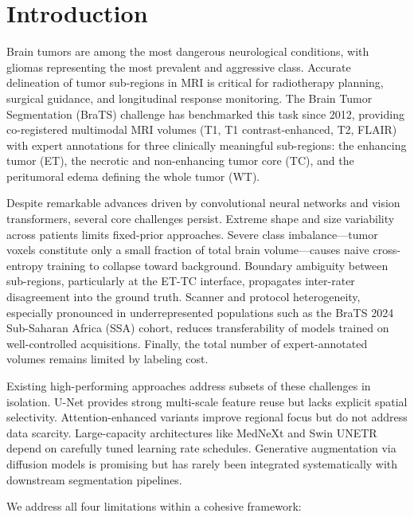 \documentclass[conference]{IEEEtran}
\begin{document}
\section{Introduction}

Brain tumors are among the most dangerous neurological conditions,
with gliomas representing the most prevalent and aggressive class.
Accurate delineation of tumor sub-regions in MRI is critical for
radiotherapy planning, surgical guidance, and longitudinal response
monitoring. The Brain Tumor Segmentation (BraTS) challenge
\cite{b1} has benchmarked this task since 2012, providing
co-registered multimodal MRI volumes (T1, T1 contrast-enhanced,
T2, FLAIR) with expert annotations for three clinically meaningful
sub-regions: the enhancing tumor (ET), the necrotic and
non-enhancing tumor core (TC), and the peritumoral edema defining
the whole tumor (WT).

Despite remarkable advances driven by convolutional neural networks
and vision transformers, several core challenges persist. Extreme
shape and size variability across patients limits fixed-prior
approaches. Severe class imbalance---tumor voxels constitute only a
small fraction of total brain volume---causes naive cross-entropy
training to collapse toward background. Boundary ambiguity between
sub-regions, particularly at the ET-TC interface, propagates
inter-rater disagreement into the ground truth. Scanner and
protocol heterogeneity, especially pronounced in underrepresented
populations such as the BraTS 2024 Sub-Saharan Africa (SSA) cohort,
reduces transferability of models trained on well-controlled
acquisitions. Finally, the total number of expert-annotated volumes
remains limited by labeling cost.

Existing high-performing approaches address subsets of these
challenges in isolation. U-Net \cite{b5} provides strong
multi-scale feature reuse but lacks explicit spatial selectivity.
Attention-enhanced variants \cite{b12} improve regional focus but
do not address data scarcity. Large-capacity architectures like
MedNeXt \cite{b3} and Swin UNETR \cite{b4} depend on carefully
tuned learning rate schedules. Generative augmentation via
diffusion models \cite{b7} is promising but has rarely been
integrated systematically with downstream segmentation pipelines.

We address all four limitations within a cohesive framework:
\end{document}

